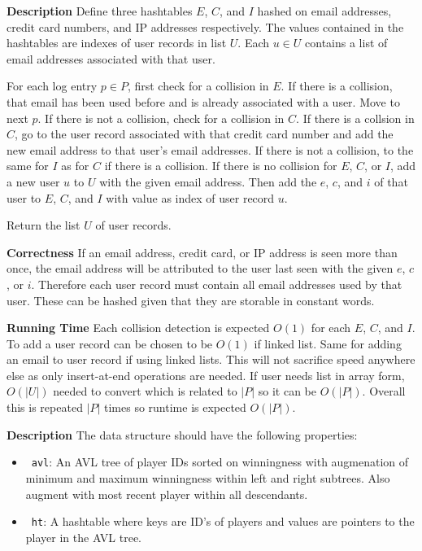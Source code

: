 \documentclass[12pt,twoside]{article}
\begin{document}
\begin{problems}
{\bf Description} Define three hashtables $E$, $C$, and $I$ hashed on email
addresses, credit card numbers, and IP addresses respectively. The values
contained in the hashtables are indexes of user records in list $U$. Each $u
\in U$ contains a list of email addresses associated with that user.

For each log entry $p \in P$, first check for a collision in $E$. If there is
a collision, that email has been used before and is already associated with a
user. Move to next $p$. If there is not a collision, check for a collision in
$C$. If there is a collsion in $C$, go to the user record associated with
that credit card number and add the new email address to that user's email
addresses. If there is not a collision, to the same for $I$ as for $C$ if
there is a collision. If there is no collision for $E$, $C$, or $I$, add a
new user $u$ to $U$ with the given email address. Then add the $e$, $c$, and
$i$ of that user to $E$, $C$, and $I$ with value as index of user record $u$.

Return the list $U$ of user records.

{\bf Correctness} If an email address, credit card, or IP address is seen
more than once, the email address will be attributed to the user last seen
with the given $e$, $c$, or $i$. Therefore each user record must contain all
email addresses used by that user. These can be hashed given that they are
storable in constant words.

{\bf Running Time} Each collision detection is expected $O(1)$ for each $E$,
$C$, and $I$. To add a user record can be chosen to be $O(1)$ if linked list.
Same for adding an email to user record if using linked lists. This will not
sacrifice speed anywhere else as only insert-at-end operations are needed. If
user needs list in array form, $O(|U|)$ needed to convert which is related to
$|P|$ so it can be $O(|P|)$. Overall this is repeated $|P|$ times so runtime
is expected $O(|P|)$.

\newpage
\problem  %

{\bf Description} The data structure should have the following properties:
\begin{itemize}
  \item\ {\tt avl}: An AVL tree of player IDs sorted on winningness with
  augmenation of minimum and maximum winningness within left and right
  subtrees. Also augment with most recent player within all descendants.
  \item\ {\tt ht}: A hashtable where keys are ID's of players and values are
  pointers to the player in the AVL tree.
\end{itemize}


\end{problems}
\end{document}
